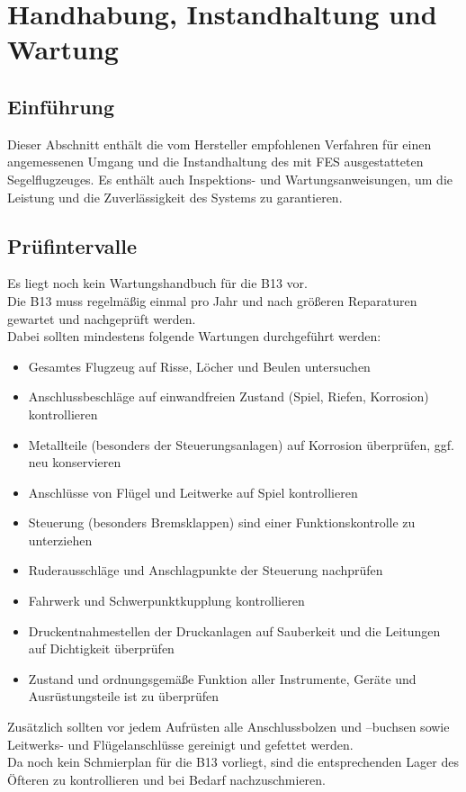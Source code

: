 \chapter{ Handhabung, Instandhaltung und Wartung}
\section{Einführung}
Dieser Abschnitt enthält die vom Hersteller empfohlenen Verfahren für einen angemessenen Umgang und die Instandhaltung des mit FES ausgestatteten Segelflugzeuges. Es enthält auch Inspektions- und Wartungsanweisungen, um die Leistung und die Zuverlässigkeit des Systems zu garantieren.

\section{Prüfintervalle}
Es liegt noch kein Wartungshandbuch für die B13 vor. \\
\newline
Die B13 muss regelmäßig einmal pro Jahr und nach größeren Reparaturen gewartet und nachgeprüft werden. \\
\newline
Dabei sollten mindestens folgende Wartungen durchgeführt werden:
\begin{itemize}
\item Gesamtes Flugzeug auf Risse, Löcher und Beulen untersuchen
\item Anschlussbeschläge auf einwandfreien Zustand (Spiel, Riefen, Korrosion) kontrollieren 
\item Metallteile (besonders der Steuerungsanlagen) auf Korrosion überprüfen, ggf. neu konservieren
\item Anschlüsse von Flügel und Leitwerke auf Spiel kontrollieren
\item Steuerung (besonders Bremsklappen) sind einer Funktionskontrolle zu unterziehen
\item Ruderausschläge und Anschlagpunkte der Steuerung nachprüfen
\item Fahrwerk und Schwerpunktkupplung kontrollieren 
\item Druckentnahmestellen der Druckanlagen auf Sauberkeit und die Leitungen auf Dichtigkeit überprüfen
\item Zustand und ordnungsgemäße Funktion aller Instrumente, Geräte und Ausrüstungsteile ist zu überprüfen
\end{itemize}

Zusätzlich sollten vor jedem Aufrüsten alle Anschlussbolzen und –buchsen sowie Leitwerks- und Flügelanschlüsse gereinigt und gefettet werden. \\
\newline
Da noch kein Schmierplan für die B13 vorliegt, sind die entsprechenden Lager des Öfteren zu kontrollieren und bei Bedarf nachzuschmieren. \\

